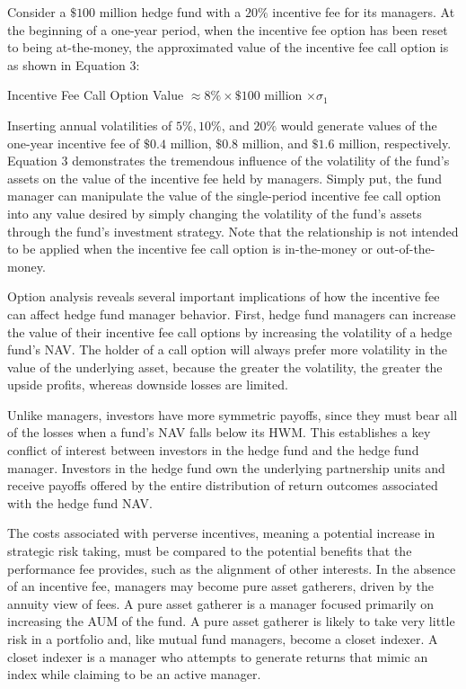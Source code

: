 \documentclass[11pt]{article}
\begin{document}
Consider a $\$ 100$ million hedge fund with a $20 \%$ incentive fee for its managers. At the beginning of a one-year period, when the incentive fee option has been reset to being at-the-money, the approximated value of the incentive fee call option is as shown in Equation 3:

Incentive Fee Call Option Value $\approx 8 \% \times \$ 100$ million $\times \sigma_{1}$

Inserting annual volatilities of $5 \%, 10 \%$, and $20 \%$ would generate values of the one-year incentive fee of $\$ 0.4$ million, $\$ 0.8$ million, and $\$ 1.6$ million, respectively. Equation 3 demonstrates the tremendous influence of the volatility of the fund's assets on the value of the incentive fee held by managers. Simply put, the fund manager can manipulate the value of the single-period incentive fee call option into any value desired by simply changing the volatility of the fund's assets through the fund's investment strategy. Note that the relationship is not intended to be applied when the incentive fee call option is in-the-money or out-of-the-money.

Option analysis reveals several important implications of how the incentive fee can affect hedge fund manager behavior. First, hedge fund managers can increase the value of their incentive fee call options by increasing the volatility of a hedge fund's NAV. The holder of a call option will always prefer more volatility in the value of the underlying asset, because the greater the volatility, the greater the upside profits, whereas downside losses are limited.

Unlike managers, investors have more symmetric payoffs, since they must bear all of the losses when a fund's NAV falls below its HWM. This establishes a key conflict of interest between investors in the hedge fund and the hedge fund manager. Investors in the hedge fund own the underlying partnership units and receive payoffs offered by the entire distribution of return outcomes associated with the hedge fund NAV.

The costs associated with perverse incentives, meaning a potential increase in strategic risk taking, must be compared to the potential benefits that the performance fee provides, such as the alignment of other interests. In the absence of an incentive fee, managers may become pure asset gatherers, driven by the annuity view of fees. A pure asset gatherer is a manager focused primarily on increasing the AUM of the fund. A pure asset gatherer is likely to take very little risk in a portfolio and, like mutual fund managers, become a closet indexer. A closet indexer is a manager who attempts to generate returns that mimic an index while claiming to be an active manager.
\end{document}

